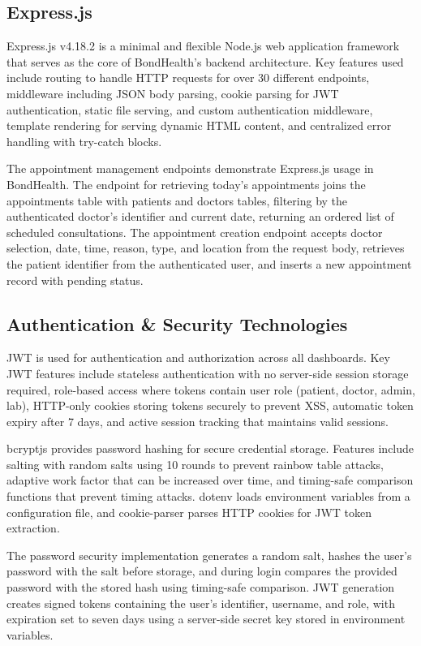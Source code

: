 \subsection{Express.js}

\justifying
\noindent Express.js v4.18.2 is a minimal and flexible Node.js web application framework that serves as the core of BondHealth's backend architecture. Key features used include routing to handle HTTP requests for over 30 different endpoints, middleware including JSON body parsing, cookie parsing for JWT authentication, static file serving, and custom authentication middleware, template rendering for serving dynamic HTML content, and centralized error handling with try-catch blocks.

\noindent The appointment management endpoints demonstrate Express.js usage in BondHealth. The endpoint for retrieving today's appointments joins the appointments table with patients and doctors tables, filtering by the authenticated doctor's identifier and current date, returning an ordered list of scheduled consultations. The appointment creation endpoint accepts doctor selection, date, time, reason, type, and location from the request body, retrieves the patient identifier from the authenticated user, and inserts a new appointment record with pending status.

\subsection{Authentication \& Security Technologies}

\justifying
\noindent JWT is used for authentication and authorization across all dashboards. Key JWT features include stateless authentication with no server-side session storage required, role-based access where tokens contain user role (patient, doctor, admin, lab), HTTP-only cookies storing tokens securely to prevent XSS, automatic token expiry after 7 days, and active session tracking that maintains valid sessions.

\justifying
\noindent bcryptjs provides password hashing for secure credential storage. Features include salting with random salts using 10 rounds to prevent rainbow table attacks, adaptive work factor that can be increased over time, and timing-safe comparison functions that prevent timing attacks. dotenv loads environment variables from a configuration file, and cookie-parser parses HTTP cookies for JWT token extraction.

\noindent The password security implementation generates a random salt, hashes the user's password with the salt before storage, and during login compares the provided password with the stored hash using timing-safe comparison. JWT generation creates signed tokens containing the user's identifier, username, and role, with expiration set to seven days using a server-side secret key stored in environment variables.

